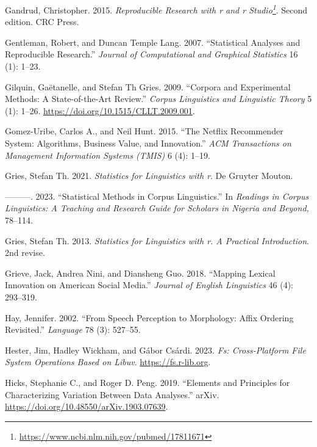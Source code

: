 \documentclass[
  letterpaper,
  DIV=11,
  numbers=noendperiod]{scrreport}
\newlength{\cslhangindent}
\newlength{\cslentryspacingunit} %
\newenvironment{CSLReferences}[2] %
 {%
  \setlength{\parindent}{0pt}
  \ifodd #1
  \let\oldpar\par
  \def\par{\hangindent=\cslhangindent\oldpar}
  \fi
  \setlength{\parskip}{#2\cslentryspacingunit}
 }%
 {}
\theoremstyle{definition}
\theoremstyle{remark}
\DeclareRobustCommand{\href}[2]{#2\footnote{\url{#1}}}
\begin{document}
\begin{CSLReferences}{1}{0}
\leavevmode{}%
Gandrud, Christopher. 2015.
\emph{\href{https://www.ncbi.nlm.nih.gov/pubmed/17811671}{Reproducible
Research with r and r Studio}}. Second edition. CRC Press.

\leavevmode{}%
Gentleman, Robert, and Duncan Temple Lang. 2007. {``Statistical Analyses
and Reproducible Research.''} \emph{Journal of Computational and
Graphical Statistics} 16 (1): 1--23.

\leavevmode{}%
Gilquin, Gaëtanelle, and Stefan Th Gries. 2009. {``Corpora and
Experimental Methods: A State-of-the-Art Review.''} \emph{Corpus
Linguistics and Linguistic Theory} 5 (1): 1--26.
\url{https://doi.org/10.1515/CLLT.2009.001}.

\leavevmode{}%
Gomez-Uribe, Carlos A., and Neil Hunt. 2015. {``The Netflix Recommender
System: Algorithms, Business Value, and Innovation.''} \emph{ACM
Transactions on Management Information Systems (TMIS)} 6 (4): 1--19.

\leavevmode{}%
Gries, Stefan Th. 2021. \emph{Statistics for Linguistics with r}. De
Gruyter Mouton.

\leavevmode{}%
---------. 2023. {``Statistical Methods in Corpus Linguistics.''} In
\emph{Readings in Corpus Linguistics: A Teaching and Research Guide for
Scholars in Nigeria and Beyond,} 78--114.

\leavevmode{}%
Gries, Stefan Th. 2013. \emph{Statistics for Linguistics with r. A
Practical Introduction}. 2nd revise.

\leavevmode{}%
Grieve, Jack, Andrea Nini, and Diansheng Guo. 2018. {``Mapping Lexical
Innovation on American Social Media.''} \emph{Journal of English
Linguistics} 46 (4): 293--319.

\leavevmode{}%
Hay, Jennifer. 2002. {``From Speech Perception to Morphology: Affix
Ordering Revisited.''} \emph{Language} 78 (3): 527--55.

\leavevmode{}%
Hester, Jim, Hadley Wickham, and Gábor Csárdi. 2023. \emph{Fs:
Cross-Platform File System Operations Based on Libuv}.
\url{https://fs.r-lib.org}.

\leavevmode{}%
Hicks, Stephanie C., and Roger D. Peng. 2019. {``Elements and Principles
for Characterizing Variation Between Data Analyses.''} arXiv.
\url{https://doi.org/10.48550/arXiv.1903.07639}.


\end{CSLReferences}
\end{document}
